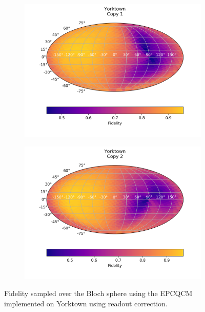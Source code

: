   \begin{figure}[H]
    \centering
    \begin{subfigure}{.5\textwidth}
      \centering
      \includegraphics[width=\textwidth]{Figures/Economical/IBM/FullSphere/results_ibmqx2_copy1.png}
      
      \label{fig:epc_uncorrected_yorktown_sphere_1}
    \end{subfigure}%
    \begin{subfigure}{.5\textwidth}
      \centering
      \includegraphics[width=\textwidth]{Figures/Economical/IBM/FullSphere/results_ibmqx2_copy2.png}
      
      \label{fig:epc_uncorrected_yorktown_sphere_2}
    \end{subfigure}
    \caption{Fidelity sampled over the Bloch sphere using the EPCQCM implemented on Yorktown using readout correction.}
    \label{fig:epc_uncorrected_yorktown_sphere}
  \end{figure}


